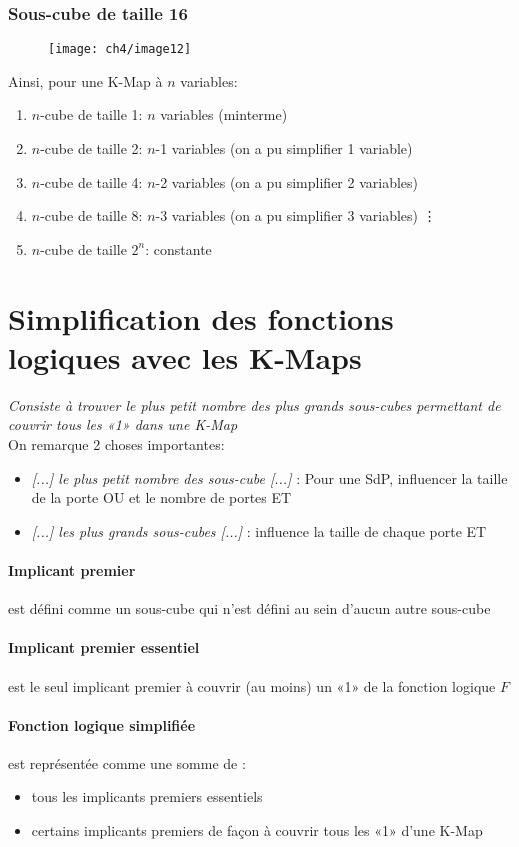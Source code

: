 \subsubsection{Sous-cube de taille 16}
	\begin{figure}[H]
		\centering
		\texttt{[image: ch4/image12]}
	\end{figure}


Ainsi, pour une K-Map à $n$ variables:
\begin{enumerate}
	\item $n$-cube de taille 1: $n$ variables (minterme)
	\item $n$-cube de taille 2: $n$-1 variables (on a pu simplifier 1 variable)
	\item $n$-cube de taille 4: $n$-2 variables (on a pu simplifier 2 variables)
	\item $n$-cube de taille 8: $n$-3 variables (on a pu simplifier 3 variables)
	\vdots
	\item $n$-cube de taille $2^n$: constante
\end{enumerate}
\section{Simplification des fonctions logiques avec les K-Maps}
\textit{Consiste à trouver le plus petit nombre des plus grands sous-cubes permettant de couvrir tous les «1» dans une K-Map}\\
On remarque 2 choses importantes:
\begin{itemize}
	\item \textit{[...] le plus petit nombre des sous-cube [...]} : Pour une SdP, influencer la taille de la porte OU et le nombre de portes ET
	\item \textit{[...] les plus grands sous-cubes [...]} : influence la taille de chaque porte ET
\end{itemize}
\paragraph{Implicant premier} est défini comme un sous-cube qui n'est défini au sein d'aucun autre sous-cube
\paragraph{Implicant premier essentiel} est le seul implicant premier à couvrir (au moins) un «1» de la fonction logique $F$

\paragraph{Fonction logique simplifiée} est représentée comme une somme de :
\begin{itemize}
	\item tous les implicants premiers essentiels
	\item certains implicants premiers de façon à couvrir tous les «1» d'une K-Map
\end{itemize}

